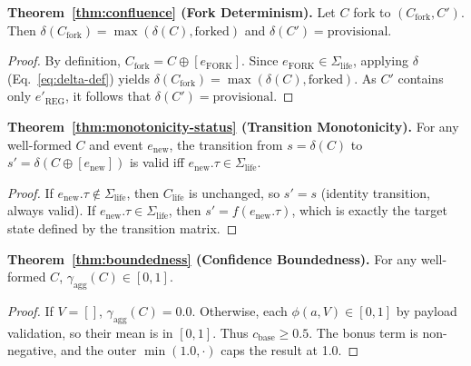 \textbf{Theorem~\ref{thm:confluence} (Fork Determinism).} Let $C$ fork to $(C_{\text{fork}}, C')$. Then $\delta(C_{\text{fork}}) = \max(\delta(C), \text{forked})$ and $\delta(C') = \text{provisional}$.
\begin{proof}
By definition, $C_{\text{fork}} = C \oplus [e_{\text{FORK}}]$. Since $e_{\text{FORK}} \in \Sigma_{\text{life}}$, applying $\delta$ (Eq.~\ref{eq:delta-def}) yields $\delta(C_{\text{fork}}) = \max(\delta(C), \text{forked})$. As $C'$ contains only $e'_{\text{REG}}$, it follows that $\delta(C') = \text{provisional}$.
\end{proof}

\textbf{Theorem~\ref{thm:monotonicity-status} (Transition Monotonicity).} For any well-formed $C$ and event $e_{\text{new}}$, the transition from $s = \delta(C)$ to $s' = \delta(C \oplus [e_{\text{new}}])$ is valid iff $e_{\text{new}}.\tau \in \Sigma_{\text{life}}$.
\begin{proof}
If $e_{\text{new}}.\tau \notin \Sigma_{\text{life}}$, then $C_{\text{life}}$ is unchanged, so $s' = s$ (identity transition, always valid). If $e_{\text{new}}.\tau \in \Sigma_{\text{life}}$, then $s' = f(e_{\text{new}}.\tau)$, which is exactly the target state defined by the transition matrix.
\end{proof}

\textbf{Theorem~\ref{thm:boundedness} (Confidence Boundedness).} For any well-formed $C$, $\gamma_{\text{agg}}(C) \in [0, 1]$.
\begin{proof}
If $V = []$, $\gamma_{\text{agg}}(C) = 0.0$. Otherwise, each $\phi(a, V) \in [0, 1]$ by payload validation, so their mean is in $[0, 1]$. Thus $c_{\text{base}} \geq 0.5$. The bonus term is non-negative, and the outer $\min(1.0, \cdot)$ caps the result at 1.0.
\end{proof}

